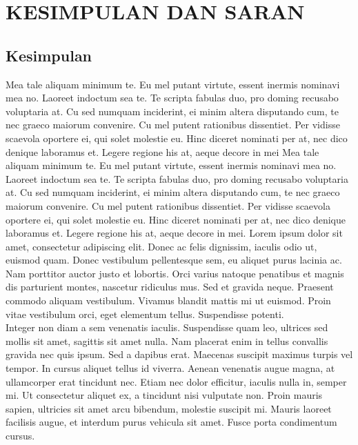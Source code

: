 \chapter{KESIMPULAN DAN SARAN}

\vspace{4.5pt}

\section{Kesimpulan}
Mea tale aliquam minimum te. Eu mel putant virtute, essent inermis nominavi mea no. Laoreet indoctum sea te. Te scripta fabulas duo, pro doming recusabo voluptaria at. Cu sed numquam inciderint, ei minim altera disputando cum, te nec graeco maiorum convenire.
Cu mel putent rationibus dissentiet. Per vidisse scaevola oportere ei, qui solet molestie eu. Hinc diceret nominati per at, nec dico denique laboramus et. Legere regione his at, aeque decore in mei
Mea tale aliquam minimum te. Eu mel putant virtute, essent inermis nominavi mea no. Laoreet indoctum sea te. Te scripta fabulas duo, pro doming recusabo voluptaria at. Cu sed numquam inciderint, ei minim altera disputando cum, te nec graeco maiorum convenire.
Cu mel putent rationibus dissentiet. Per vidisse scaevola oportere ei, qui solet molestie eu. Hinc diceret nominati per at, nec dico denique laboramus et. Legere regione his at, aeque decore in mei.
Lorem ipsum dolor sit amet, consectetur adipiscing elit. Donec ac felis dignissim, iaculis odio ut, euismod quam. Donec vestibulum pellentesque sem, eu aliquet purus lacinia ac. Nam porttitor auctor justo et lobortis. Orci varius natoque penatibus et magnis dis parturient montes, nascetur ridiculus mus. Sed et gravida neque. Praesent commodo aliquam vestibulum. Vivamus blandit mattis mi ut euismod. Proin vitae vestibulum orci, eget elementum tellus. Suspendisse potenti.\\

Integer non diam a sem venenatis iaculis. Suspendisse quam leo, ultrices sed mollis sit amet, sagittis sit amet nulla. Nam placerat enim in tellus convallis gravida nec quis ipsum. Sed a dapibus erat. Maecenas suscipit maximus turpis vel tempor. In cursus aliquet tellus id viverra. Aenean venenatis augue magna, at ullamcorper erat tincidunt nec. Etiam nec dolor efficitur, iaculis nulla in, semper mi. Ut consectetur aliquet ex, a tincidunt nisi vulputate non. Proin mauris sapien, ultricies sit amet arcu bibendum, molestie suscipit mi. Mauris laoreet facilisis augue, et interdum purus vehicula sit amet. Fusce porta condimentum cursus.\\

